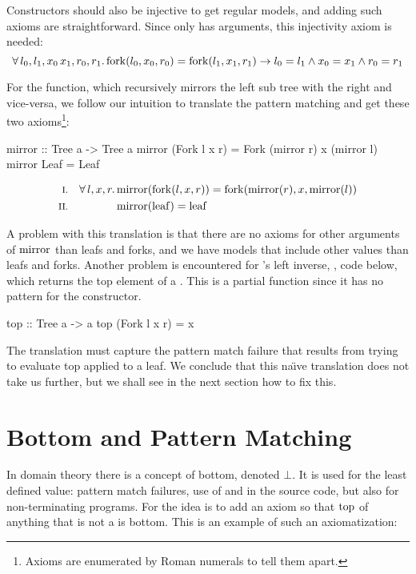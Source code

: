 Constructors should also be injective to get regular models, and
adding such axioms are straightforward. Since only  has
arguments, this injectivity axiom is needed:
\begin{equation*}
\forall \, l_0 , l_1 , x_0 \, x_1 , r_0 , r_1 . \, \mathrm{fork}(l_0,x_0,r_0) =
\mathrm{fork}(l_1,x_1,r_1) \rightarrow l_0 = l_1 \wedge x_0 = x_1 \wedge r_0 = r_1
\end{equation*}

For the  function, which recursively mirrors the left sub
tree with the right and vice-versa, we follow our intuition to
translate the pattern matching and get these two axioms\footnote
{Axioms are enumerated by Roman numerals to tell them apart.}:

\begin{code}
mirror :: Tree a -> Tree a
mirror (Fork l x r) = Fork (mirror r) x (mirror l)
mirror Leaf         = Leaf
\end{code}
\begin{align*}
\rom{1} && \faaa{l}{x}{r} & \fn{mirror}(\fn{fork}(l,x,r)) \eq \fn{fork}(\fn{mirror}(r),x,\fn{mirror}(l)) \\
\rom{2} &&                & \fn{mirror}(\fn{leaf}) \eq \fn{leaf}
\end{align*}

\noindent
A problem with this translation is that there are no axioms for other
arguments of $\mathrm{mirror}$ than leafs and forks, and we have models that
include other values than leafs and forks. Another problem is
encountered for 's left inverse, , code below,
which returns the top element of a . This is a partial
function since it has no pattern for the  constructor.

\begin{code}
top :: Tree a -> a
top (Fork l x r) = x
\end{code}

The translation must capture the pattern match failure that results
from trying to evaluate top applied to a leaf. We conclude that
this na\"{\i}ve translation does not take us further, but we shall see
in the next section how to fix this.

\section{Bottom and Pattern Matching}

In domain theory there is a concept of bottom, denoted $\bot$. It is
used for the least defined value: pattern match failures, use of
 and  in the source code, but also for
non-terminating programs. For  the idea is to add an axiom so
that $\mathrm{top}$ of anything that is not a  is bottom. This is
an example of such an axiomatization:

